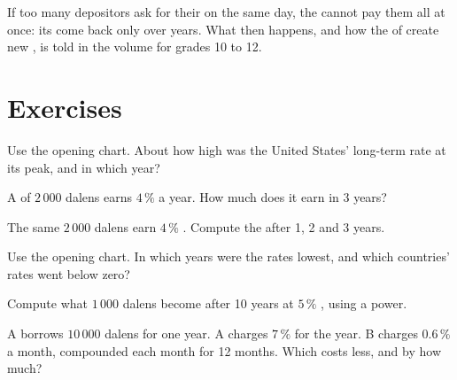 If too many depositors ask for their  on the same day, the  cannot pay them all at once: its
 come back only over years. What then happens, and how the  of  create new ,
is told in the volume for grades 10 to 12.

\section{Exercises}

\begin{exercise}[$\star$]\label{exo:g8:banks-saving-interest:1}
Use the opening chart. About how high was the United States' long-term rate at its peak, and in which
year?
\end{exercise}

\begin{exercise}[$\star$]\label{exo:g8:banks-saving-interest:2}
A  of $2\,000$ dalens earns $4\,\%$  a year. How much  does it earn in
3 years?
\end{exercise}

\begin{exercise}[$\star$]\label{exo:g8:banks-saving-interest:3}
The same $2\,000$ dalens earn $4\,\%$ . Compute the  after 1, 2 and 3 years.
\end{exercise}

\begin{exercise}[$\star$]\label{exo:g8:banks-saving-interest:4}
Use the opening chart. In which years were the rates lowest, and which countries' rates went below
zero?
\end{exercise}

\begin{exercise}[$\star\star$]\label{exo:g8:banks-saving-interest:5}
Compute what $1\,000$ dalens become after 10 years at $5\,\%$ , using a power.
\end{exercise}

\begin{exercise}[$\star\star$]\label{exo:g8:banks-saving-interest:6}
A  borrows $10\,000$ dalens for one year.  A charges $7\,\%$ for the year.  B charges
$0.6\,\%$ a month, compounded each month for 12 months. Which  costs less, and by how much?
\end{exercise}


